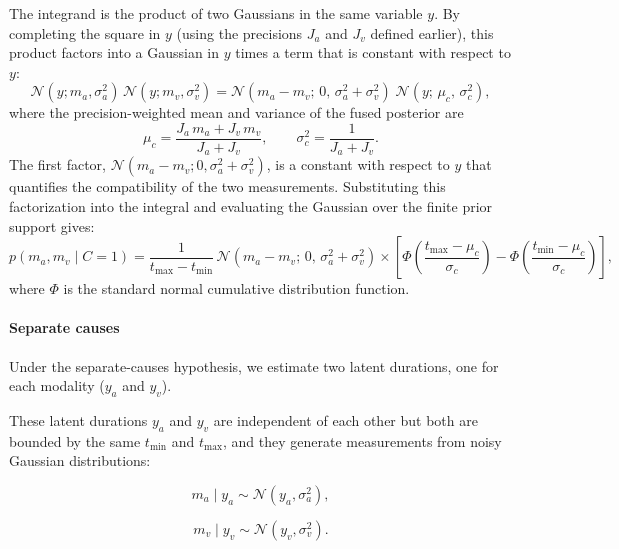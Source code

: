 \documentclass{biorxiv}
\begin{document}
The integrand is the product of two Gaussians in the same variable $y$. By completing the square in $y$ (using the precisions $J_a$ and $J_v$ defined earlier), this product factors into a Gaussian in $y$ times a term that is constant with respect to $y$:
\begin{equation}
\label{eq:product_gaussians_factorization}
\mathcal{N}(y; m_a, \sigma_a^2)\, \mathcal{N}(y; m_v, \sigma_v^2) 
= \mathcal{N}(m_a - m_v;\, 0,\, \sigma_a^2 + \sigma_v^2)\;\mathcal{N}(y;\, \mu_c,\, \sigma_c^2),
\end{equation}
where the precision-weighted mean and variance of the fused posterior are
\begin{equation}
\mu_c = \frac{J_a\, m_a + J_v\, m_v}{J_a + J_v}, 
\qquad
\sigma_c^2 = \frac{1}{J_a + J_v}.
\end{equation}
The first factor, $\mathcal{N}(m_a - m_v; 0, \sigma_a^2 + \sigma_v^2)$, is a constant with respect to $y$ that quantifies the compatibility of the two measurements.  Substituting this factorization into the integral and evaluating the Gaussian over the finite prior support gives:
\begin{equation}
\label{eq:likelihood_c1_final}
p(m_a, m_v \mid C\!=\!1) = \frac{1}{t_{\max} - t_{\min}}\, \mathcal{N}(m_a - m_v;\, 0,\, \sigma_a^2 + \sigma_v^2) 
\times \left[\Phi\!\left(\frac{t_{\max} - \mu_c}{\sigma_c}\right) - \Phi\!\left(\frac{t_{\min} - \mu_c}{\sigma_c}\right)\right],
\end{equation}
where $\Phi$ is the standard normal cumulative distribution function.

\paragraph{Separate causes}

Under the separate-causes hypothesis, we estimate two latent durations, one for each modality ($y_a$ and $y_v$).

These latent durations $y_a$ and $y_v$ are independent of each other but both are bounded by the same $t_{\min}$ and $t_{\max}$, and they generate measurements from noisy Gaussian distributions:

\begin{equation}
m_a \mid y_a \sim \mathcal{N}(y_a, \sigma_a^2),
\end{equation}

\begin{equation}
m_v \mid y_v \sim \mathcal{N}(y_v, \sigma_v^2).
\end{equation}
\end{document}
